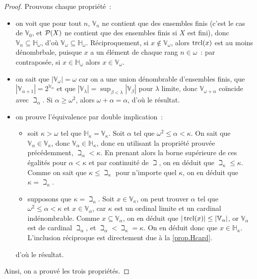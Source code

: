 \begin{proof}
  Prouvons chaque propriété~:
  \begin{itemize}
  \item on voit que pour tout $n$, $\mathbb V_n$ ne contient que des ensembles
    finis (c'est le cas de $\mathbb V_0$, et $\mathcal{P}(X)$ ne contient que des
    ensembles finis si $X$ est fini), donc
    $\mathbb V_n \subseteq \mathbb H_\omega$, d'où
    $\mathbb V_\omega \subseteq \mathbb H_\omega$. Réciproquement, si
    $x \notin \mathbb V_\omega$, alors $\operatorname{trcl}(x)$ est au moins dénombrbale,
    puisque $x$ a un élément de chaque rang $n \in \omega$~: par contraposée,
    si $x\in \mathbb H_\omega$ alors $x\in \mathbb V_\omega$.
  \item on sait que $|\mathbb V_\omega| = \omega$ car on a une union
    dénombrable d'ensembles finis, que
    $|\mathbb V_{\alpha + 1}| = 2^{\mathbb V_\alpha}$ et que
    $|\mathbb V_\lambda | = \sup_{\beta < \lambda} |\mathbb V_\beta|$ pour
    $\lambda$ limite, donc $\mathbb V_{\omega + \alpha}$ coïncide avec
    $\beth_\alpha$. Si $\alpha \geq \omega^2$, alors $\omega + \alpha = \alpha$,
    d'où le résultat.
  \item on prouve l'équivalence par double implication~:
    \begin{itemize}
    \item soit $\kappa > \omega$ tel que $\mathbb H_\kappa = \mathbb V_\kappa$.
      Soit $\alpha$ tel que $\omega^2\leq \alpha < \kappa$. On sait que
      $\mathbb V_\alpha \in \mathbb V_\kappa$, donc
      $\mathbb V_\alpha \in \mathbb H_\kappa$, donc en utilisant la propriété
      prouvée précédemment, $\beth_\alpha < \kappa$. En prenant alors la borne
      supérieure de ces égalités pour $\alpha < \kappa$ et par continuité de
      $\beth$, on en déduit que $\beth_\kappa \leq \kappa$. Comme on sait que
      $\kappa \leq \beth_\kappa$ pour n'importe quel $\kappa$, on en déduit que
      $\kappa = \beth_\kappa$.
    \item supposons que $\kappa = \beth_\kappa$. Soit $x \in \mathbb V_\kappa$,
      on peut trouver $\alpha$ tel que $\omega^2\leq \alpha < \kappa$ et
      $x \in \mathbb V_\alpha$, car $\kappa$ est un ordinal limite et un
      cardinal indénombrable. Comme $x \subseteq \mathbb V_\alpha$, on en
      déduit que $|\operatorname{trcl}(x)| \leq |\mathbb V_\alpha|$, or $\mathbb V_\alpha$ est
      de cardinal $\beth_\alpha$, et $\beth_\alpha < \beth_\kappa = \kappa$. On
      en déduit donc que $x \in \mathbb H_\kappa$. L'inclusion réciproque est
      directement due à la \cref{prop.Hcard}.
    \end{itemize}
    d'où le résultat.
  \end{itemize}
  Ainsi, on a prouvé les trois propriétés.
\end{proof}

